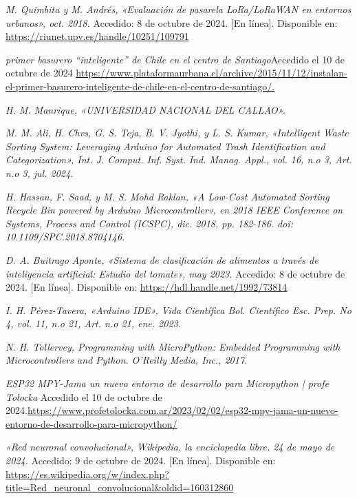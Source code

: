 \begin{thebibliography}{99}
    \textit{M. Quimbita y M. Andrés, «Evaluación de pasarela LoRa/LoRaWAN en entornos urbanos», oct. 2018.} Accedido: 8 de octubre de 2024. [En línea]. Disponible en: \url{https://riunet.upv.es/handle/10251/109791}

    \textit{primer basurero “inteligente” de Chile en el centro de Santiago}Accedido el 10 de octubre de 2024 \url{https://www.plataformaurbana.cl/archive/2015/11/12/instalan-el-primer-basurero-inteligente-de-chile-en-el-centro-de-santiago/.}
    
    \textit{H. M. Manrique, «UNIVERSIDAD NACIONAL DEL CALLAO».}
    
    \textit{M. M. Ali, H. Chvs, G. S. Teja, B. V. Jyothi, y L. S. Kumar, «Intelligent Waste Sorting System: Leveraging Arduino for Automated Trash Identification and Categorization», Int. J. Comput. Inf. Syst. Ind. Manag. Appl., vol. 16, n.o 3, Art. n.o 3, jul. 2024.}
    
    \textit{H. Hassan, F. Saad, y M. S. Mohd Raklan, «A Low-Cost Automated Sorting Recycle Bin powered by Arduino Microcontroller», en 2018 IEEE Conference on Systems, Process and Control (ICSPC), dic. 2018, pp. 182-186. doi: 10.1109/SPC.2018.8704146.}
    
    \textit{D. A. Buitrago Aponte, «Sistema de clasificación de alimentos a través de inteligencia artificial: Estudio del tomate», may 2023.} Accedido: 8 de octubre de 2024. [En línea]. Disponible en: \url{https://hdl.handle.net/1992/73814}
    
    \textit{I. H. Pérez-Tavera, «Arduino IDE», Vida Científica Bol. Científico Esc. Prep. No 4, vol. 11, n.o 21, Art. n.o 21, ene. 2023.}
    
    \textit{N. H. Tollervey, Programming with MicroPython: Embedded Programming with Microcontrollers and Python. O’Reilly Media, Inc., 2017.}

    \textit{ESP32 MPY-Jama un nuevo entorno de desarrollo para Micropython | profe Tolocka} Accedido el 10 de octubre de 2024.\url{https://www.profetolocka.com.ar/2023/02/02/esp32-mpy-jama-un-nuevo-entorno-de-desarrollo-para-micropython/}
    
    \textit{«Red neuronal convolucional», Wikipedia, la enciclopedia libre. 24 de mayo de 2024.} Accedido: 9 de octubre de 2024. [En línea]. Disponible en: \url{https://es.wikipedia.org/w/index.php?title=Red_neuronal_convolucional&oldid=160312860}
    

\end{thebibliography}
